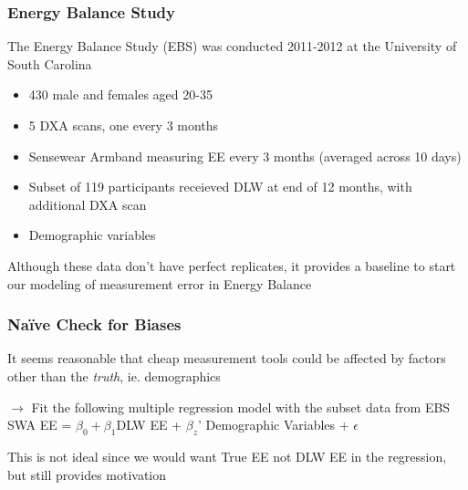 \documentclass[handout]{beamer}\usepackage[]{graphicx}\usepackage[]{color}
\begin{document}
\begin{frame}
\frametitle{Energy Balance Study}
The Energy Balance Study (EBS) was conducted 2011-2012 at the University of South Carolina
\begin{itemize}
\item
430 male and females aged 20-35 \\
\item
5 DXA scans, one every 3 months
\item
Sensewear Armband measuring EE every 3 months (averaged across 10 days)
\item
Subset of 119 participants receieved DLW at end of 12 months, with additional DXA scan
\item
Demographic variables
\end{itemize}

\vspace{0.2cm}

Although these data don't have perfect replicates, it provides a baseline to start our modeling of measurement error in Energy Balance


\end{frame}

% 
% 

% 
% 
% 
% 

\begin{frame}
\frametitle{Na{\"i}ve Check for Biases}
It seems reasonable that cheap measurement tools could be affected by factors other than the \emph{truth}, ie. demographics \\

\vspace{0.3cm}

$\rightarrow$ Fit the following multiple regression model with the subset data from EBS\\
SWA EE = $\beta_0 + \beta_1$DLW EE + $\beta_z$' Demographic Variables + $\epsilon$ \\

\vspace{0.3cm}

This is not ideal since we would want True EE not DLW EE in the regression, but still provides motivation


\end{frame}
\end{document}
